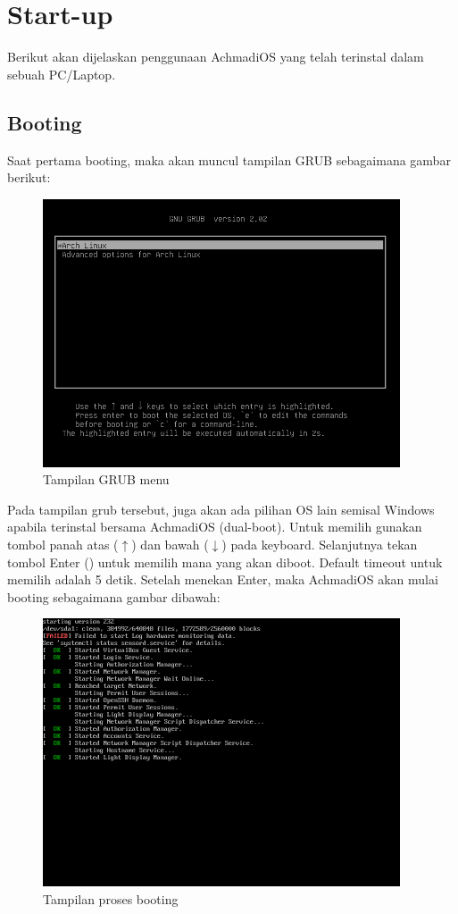 \documentclass[12pt,]{article}
\begin{document}
	\newpage

	\section{Start-up}

	Berikut akan dijelaskan penggunaan AchmadiOS yang telah terinstal dalam sebuah PC/Laptop.

	\subsection{Booting}

	Saat pertama booting, maka akan muncul tampilan GRUB sebagaimana gambar berikut:

	\begin{figure}[!ht]
		\centering
		\includegraphics[width=300pt]{png/grub}
		\caption{Tampilan GRUB menu}
	\end{figure}

	Pada tampilan grub tersebut, juga akan ada pilihan OS lain semisal Windows apabila terinstal bersama AchmadiOS (dual-boot).
	Untuk memilih gunakan tombol panah atas ($\uparrow$) dan bawah ($\downarrow$) pada keyboard.
	Selanjutnya tekan tombol Enter (\keys{\return}) untuk memilih mana yang akan diboot.
	Default timeout untuk memilih adalah 5 detik.
	Setelah menekan Enter, maka AchmadiOS akan mulai booting sebagaimana gambar dibawah:

	\begin{figure}[!ht]
		\centering
		\includegraphics[width=300pt]{png/boot}
		\caption{Tampilan proses booting}
	\end{figure}
\end{document}
